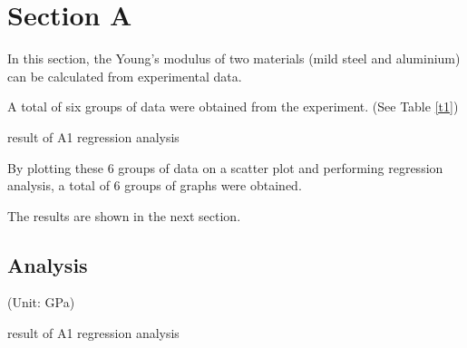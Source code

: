 \section*{Section A}
\label{sec:Section A}
\FloatBarrier %


In this section, the Young's modulus of two materials 
(mild steel and aluminium) can be calculated from experimental data.

A total of six groups of data were obtained from the experiment. (See Table \ref{t1})

\begin{minipage}[t]{\textwidth}
    \makeatletter{}
    \centering
    \caption{result of A1 regression analysis}
    \label{t1} 
\end{minipage}



By plotting these 6 groups of data on a scatter plot and performing 
regression analysis, a total of 6 groups of graphs were obtained.

The results are shown in the next section.


\subsection*{Analysis}





\begin{minipage}[t]{\textwidth}
    \makeatletter{}
    \centering
    
    (Unit: GPa)
    \caption{result of A1 regression analysis}
    \label{table4} 
\end{minipage}


